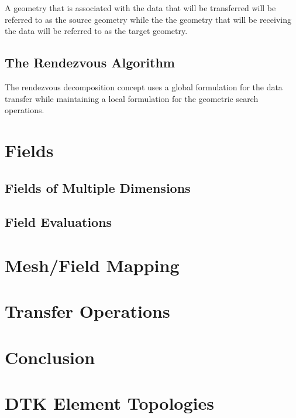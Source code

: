 \documentclass[letterpaper,12pt]{article}
\begin{document}
A geometry that is associated with the data that will be transferred
will be referred to as the source geometry while the the geometry that
will be receiving the data will be referred to as the target geometry.

\subsection{The Rendezvous Algorithm}\label{subsec:rendezvous_alg}
The rendezvous decomposition concept uses a global formulation for
the data transfer while maintaining a local formulation for the
geometric search operations.

\clearpage

\section{Fields}\label{sec:field}

\subsection{Fields of Multiple Dimensions}\label{subsec:field_dim}

\subsection{Field Evaluations}\label{subsec:eval}

\clearpage

\section{Mesh/Field Mapping}\label{sec:map}

\clearpage

\section{Transfer Operations}\label{sec:transfer}

\clearpage

\section{Conclusion}\label{sec:conc}

\clearpage

\appendix
\section{DTK Element Topologies}\label{apdx:cell_topo}

\pagebreak


\end{document}
